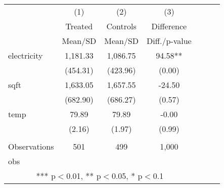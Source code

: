 {\def\sym#1{\ifmmode^{#1}\else\(^{#1}\)\fi} \begin{tabular}{l*{3}{cc}} \hline
                    &\multicolumn{1}{c}{(1)}&\multicolumn{1}{c}{(2)}&\multicolumn{1}{c}{(3)}\\
                    &\multicolumn{1}{c}{Treated}&\multicolumn{1}{c}{Controls}&\multicolumn{1}{c}{Difference}\\
                    &     Mean/SD&     Mean/SD&Diff./p-value  \\
\hline
electricity         &    1,181.33&    1,086.75&       94.58**\\
                    &    (454.31)&    (423.96)&      (0.00)  \\
sqft                &    1,633.05&    1,657.55&      -24.50  \\
                    &    (682.90)&    (686.27)&      (0.57)  \\
temp                &       79.89&       79.89&       -0.00  \\
                    &      (2.16)&      (1.97)&      (0.99)  \\
 & & & \\
Observations        &         501&         499&       1,000  \\
obs                 &            &            &              \\
\hline \multicolumn{4}{c}{ *** p$<$0.01, ** p$<$0.05, * p$<$0.1} \\ \end{tabular} }
